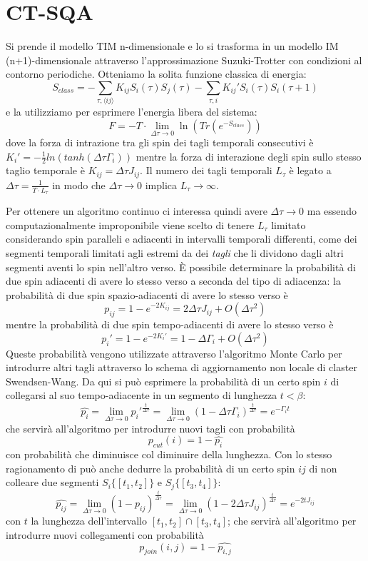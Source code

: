 \section{CT-SQA}
Si prende il modello TIM n-dimensionale e lo si trasforma in un modello IM (n+1)-dimensionale attraverso l'approssimazione Suzuki-Trotter con condizioni al contorno periodiche. Otteniamo la solita funzione classica di energia:
$$S_{class} = - \sum_{\tau,\langle ij \rangle} K_{ij} S_i(\tau) S_j(\tau) - \sum_{\tau, i} K_{ij}' S_i(\tau) S_i(\tau+1)$$
e la utilizziamo per esprimere l'energia libera del sistema:
$$F = - T \cdot \lim_{\Delta \tau \to 0} \ln(Tr(e^{-S_{class}}))$$
dove la forza di intrazione tra gli spin dei tagli temporali consecutivi è $K_{i}' = - \frac{1}{2} ln( tanh( \Delta \tau \Gamma_i) )$ mentre la forza di interazione degli spin sullo stesso taglio temporale è $K_{ij} = \Delta \tau J_{ij}$. Il numero dei tagli temporali $L_{\tau}$ è legato a $\Delta \tau = \frac{1}{T \cdot L_{\tau}}$ in modo che $\Delta \tau \to 0$ implica $L_{\tau} \to \infty$.

Per ottenere un algoritmo continuo ci interessa quindi avere $\Delta \tau \to 0$ ma essendo computazionalmente improponibile viene scelto di tenere $L_{\tau}$ limitato considerando spin paralleli e adiacenti in intervalli temporali differenti, come dei segmenti temporali limitati agli estremi da dei \textit{tagli} che li dividono dagli altri segmenti aventi lo spin nell'altro verso.
È possibile determinare la probabilità di due spin adiacenti di avere lo stesso verso a seconda del tipo di adiacenza:
la probabilità di due spin spazio-adiacenti di avere lo stesso verso è
$$p_{ij} = 1 - e^{-2K_{ij}} = 2\Delta \tau J_{ij} + O(\Delta \tau^2)$$
mentre la probabilità di due spin tempo-adiacenti di avere lo stesso verso è
$$p_i' = 1 - e^{-2K_{i}'} = 1 - \Delta \Gamma_{i} + O(\Delta \tau^2)$$
Queste probabilità vengono utilizzate attraverso l'algoritmo Monte Carlo per introdurre altri tagli attraverso lo schema di aggiornamento non locale di claster Swendsen-Wang.
Da qui si può esprimere la probabilità di un certo spin $i$ di collegarsi al suo tempo-adiacente in un segmento di lunghezza $t < \beta$:
$$\hat{p_i} = \lim_{\Delta \tau \to 0} p_i'^{\frac{t}{\Delta \tau}} = \lim_{\Delta \tau \to 0} (1 - \Delta \tau \Gamma_i)^\frac{t}{\Delta \tau} = e^{- \Gamma_i t}$$
che servirà all'algoritmo per introdurre nuovi tagli con probabilità
$$p_{cut}(i) = 1 - \hat{p_i}$$
con probabilità che diminuisce col diminuire della lunghezza.
Con lo stesso ragionamento di può anche dedurre la probabilità di un certo spin $ij$ di non colleare due segmenti $S_i\{[t_1, t_2]\}$ e $S_j\{[t_3, t_4]\}$:
$$\hat{p_{ij}} = \lim_{\Delta \tau \to 0} (1 - p_{ij})^\frac{t}{\Delta \tau} = \lim_{\Delta \tau \to 0} (1 - 2\Delta \tau J_{ij})^\frac{t}{\Delta \tau} = e^{-2 t J_{ij}}$$
con $t$ la lunghezza dell'intervallo $[t_1, t_2] \cap [t_3, t_4]$; che servirà all'algoritmo per introdurre nuovi collegamenti con probabilità
$$p_{join}(i,j) = 1 - \hat{p_{i,j}}$$

